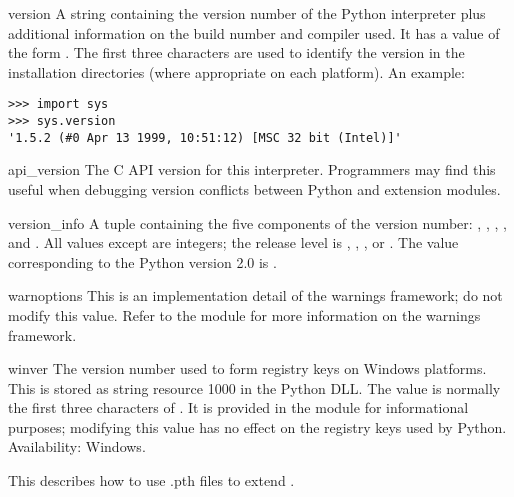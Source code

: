 \begin{datadesc}{version}
  A string containing the version number of the Python interpreter
  plus additional information on the build number and compiler used.
  It has a value of the form .  The first three characters are used to identify
  the version in the installation directories (where appropriate on
  each platform).  An example:

\begin{verbatim}
>>> import sys
>>> sys.version
'1.5.2 (#0 Apr 13 1999, 10:51:12) [MSC 32 bit (Intel)]'
\end{verbatim}
\end{datadesc}

\begin{datadesc}{api_version}
  The C API version for this interpreter.  Programmers may find this useful
  when debugging version conflicts between Python and extension
  modules. 
\end{datadesc}

\begin{datadesc}{version_info}
  A tuple containing the five components of the version number:
  , , , , and
  .  All values except  are integers;
  the release level is , ,
  , or .  The 
  value corresponding to the Python version 2.0 is .
\end{datadesc}

\begin{datadesc}{warnoptions}
  This is an implementation detail of the warnings framework; do not
  modify this value.  Refer to the  module for
  more information on the warnings framework.
\end{datadesc}

\begin{datadesc}{winver}
  The version number used to form registry keys on Windows platforms.
  This is stored as string resource 1000 in the Python DLL.  The value
  is normally the first three characters of .  It is
  provided in the  module for informational purposes;
  modifying this value has no effect on the registry keys used by
  Python.
  Availability: Windows.
\end{datadesc}


\begin{seealso}
    {This describes how to use .pth files to extend .}
\end{seealso}
